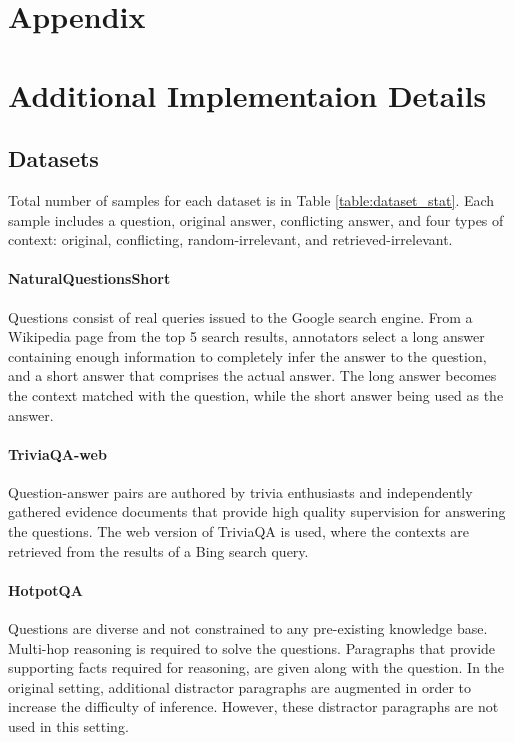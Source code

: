 \appendix
\section*{Appendix}

\section{Additional Implementaion Details}
\label{appendix:implementationDetails}


\subsection{Datasets}

Total number of samples for each dataset is in Table \ref{table:dataset_stat}.
Each sample includes a question, original answer, conflicting answer, and four types of context: original, conflicting, random-irrelevant, and retrieved-irrelevant.


\paragraph{NaturalQuestionsShort \cite{kwiatkowski-etal-2019-natural}}
Questions consist of real queries issued to the Google search engine.
From a Wikipedia page from the top 5 search results, annotators select a long answer containing enough information to completely infer the answer to the question, and a short answer that comprises the actual answer.
The long answer becomes the context matched with the question, while the short answer being used as the answer.

\paragraph{TriviaQA-web \cite{joshi2017triviaqalargescaledistantly}}
Question-answer pairs are authored by trivia enthusiasts and independently gathered evidence documents that provide high quality supervision for answering the questions.
The web version of TriviaQA is used, where the contexts are retrieved from the results of a Bing search query.

\paragraph{HotpotQA \cite{yang2018hotpotqadatasetdiverseexplainable}}
Questions are diverse and not constrained to any pre-existing knowledge base. Multi-hop reasoning is required to solve the questions.
Paragraphs that provide supporting facts required for reasoning, are given along with the question.
In the original setting, additional distractor paragraphs are augmented in order to increase the difficulty of inference. However, these distractor paragraphs are not used in this setting.

